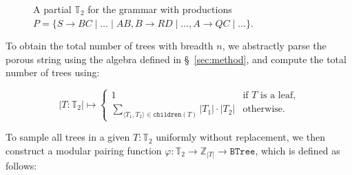 \documentclass[sigplan,nonacm]{acmart}\settopmatter{printfolios=false,printccs=false,printacmref=false}
\begin{document}
\begin{figure}[H]
\caption{A partial $\mathbb{T}_2$ for the grammar with productions $P=\{S \rightarrow BC \mid \ldots \mid AB, B\rightarrow RD \mid \ldots, A\rightarrow QC \mid \ldots\}$.}
\end{figure}

To obtain the total number of trees with breadth $n$, we abstractly parse the porous string using the algebra defined in \S~\ref{sec:method}, and compute the total number of trees using:

\begin{equation*}
  |T: \mathbb{T}_2| \mapsto \begin{cases}
    1  & \text{if $T$ is a leaf,} \\
    \sum_{\langle T_1, T_2\rangle \in \texttt{children}(T)} |T_1| \cdot |T_2| & \text{otherwise.}
  \end{cases}
\end{equation*}

To sample all trees in a given $T: \mathbb{T}_2$ uniformly without replacement, we then construct a modular pairing function $\varphi: \mathbb{T}_2 \rightarrow \mathbb{Z}_{|T|} \rightarrow \texttt{BTree}$, which is defined as follows:
\end{document}
